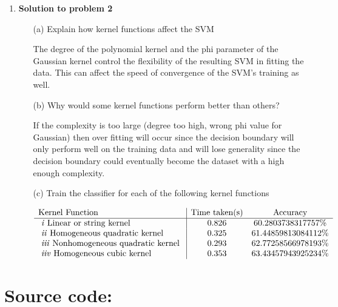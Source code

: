 \begin{enumerate}

	\item {\bf Solution to problem 2}
	
		\begin{enumerate}
		
			\item[(a)] Explain how kernel functions affect the SVM
			
			The degree of the polynomial kernel and the phi parameter of the Gaussian kernel control the flexibility of the resulting SVM in fitting the data. This can affect the speed of convergence of the SVM's training as well.
			
			\item[(b)] Why would some kernel functions perform better than others?
			
			If the complexity is too large (degree too high, wrong phi value for Gaussian) then over fitting will occur since the decision boundary will only perform well on the training data and will lose generality since the decision boundary could eventually become the dataset with a high enough complexity.
			
			\item[(c)] Train the classifier for each of the following kernel functions
			
				\(
					\begin{array}{l|cc}
					
						\text{Kernel Function} & \text{Time taken(s)} & \text{Accuracy} \\
						\hline
						\text{ \emph{i} Linear or string kernel } & 0.826 & 60.2803738317757\% \\
						\text{ \emph{ii} Homogeneous quadratic kernel } & 0.325 & 61.44859813084112\% \\
						\text{ \emph{iii} Nonhomogeneous quadratic kernel } & 0.293 & 62.77258566978193\% \\
						\text{ \emph{iiv} Homogeneous cubic kernel } & 0.353 & 63.43457943925234\% \\
					
					\end{array}
				\)
			
		\end{enumerate}	 	

\end{enumerate}

\section{Source code:}

